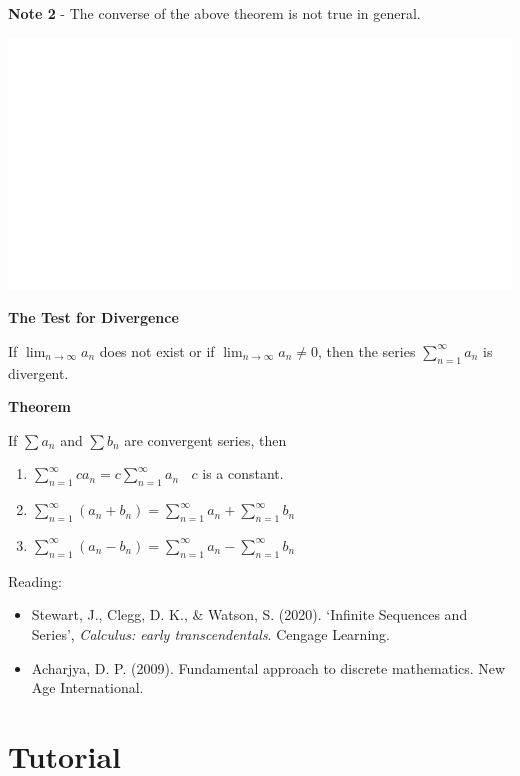 \documentclass[]{book}
\begin{document}
\textbf{Note 2}
- The converse of the above theorem is not true in general.

\begin{center}\includegraphics[width=1\linewidth]{figure/seqbox4-1} \end{center}

\textbf{The Test for Divergence}

If \(\lim_{n\to \infty}a_n\) does not exist or if \(\lim_{n\to \infty}a_n \neq0\), then the series \(\sum_{n=1}^\infty a_n\) is divergent.

\textbf{Theorem}

If \(\sum a_n\) and \(\sum b_n\) are convergent series, then

\begin{enumerate}
\def\labelenumi{\alph{enumi})}
\item
  \(\sum_{n=1}^\infty ca_n= c\sum_{n=1}^\infty a_n \;\;\) \(c\) is a constant.
\item
  \(\sum_{n=1}^\infty (a_n+b_n)= \sum_{n=1}^\infty a_n+ \sum_{n=1}^\infty b_n\)
\item
  \(\sum_{n=1}^\infty (a_n-b_n)= \sum_{n=1}^\infty a_n- \sum_{n=1}^\infty b_n\)
\end{enumerate}

Reading:

\begin{itemize}
\item
  Stewart, J., Clegg, D. K., \& Watson, S. (2020). `Infinite Sequences and Series', \emph{Calculus: early transcendentals}. Cengage Learning.
\item
  Acharjya, D. P. (2009). Fundamental approach to discrete mathematics. New Age International.
\end{itemize}

\newpage
{}

\hypertarget{tutorial}{%
\section*{Tutorial}\label{tutorial}}
\end{document}
